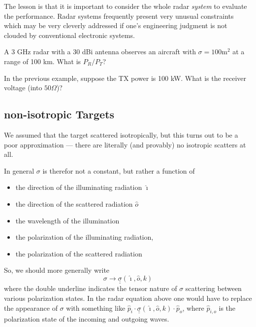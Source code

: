 The lesson is that it is important to consider the whole radar
\textit{system} to evaluate the performance.  Radar systems frequently
present very unusual constraints which may be very cleverly addressed
if one's engineering judgment is not clouded by conventional
electronic systems.

\begin{example}
A 3 GHz radar with a 30 dBi antenna observes an aircraft with $\sigma
= 100 \textrm{m}^2$ at a range of 100 km.  What is $P_R/P_T$?

\end{example}

\begin{example} In the previous example, suppose the TX power is 100
  kW.  What is the receiver voltage (into $50 \Omega$)?

\end{example}



\subsection{non-isotropic Targets}

We assumed that the target scattered isotropically, but this turns out
to be a poor approximation --- there are literally (and provably) no
isotropic scatters at all.

In general $\sigma$ is therefor not a constant, but rather a function
of 
\begin{itemize}
\item the direction of the illuminating radiation $\hat{\imath}$
\item the direction of the scattered radiation $\hat{o}$
\item the wavelength of the illumination
\item the polarization of the illuminating radiation,
\item the polarization of the scattered radiation
\end{itemize}
So, we should more generally write
\begin{displaymath}
\sigma \rightarrow \underline{\underline{\sigma}}(\hat{\imath},\hat{o},k)
\end{displaymath}
where the double underline indicates the tensor nature of $\sigma$
scattering between various polarization states.  In the radar equation
above one would have to replace the appearance of $\sigma$ with
something like
$\hat{p}_i\cdot\underline{\underline{\sigma}}(\hat{\imath},\hat{o},k)\cdot\hat{p}_o$,
where $\hat{p}_{i,o}$ is the polarization state of the incoming and
outgoing waves.

